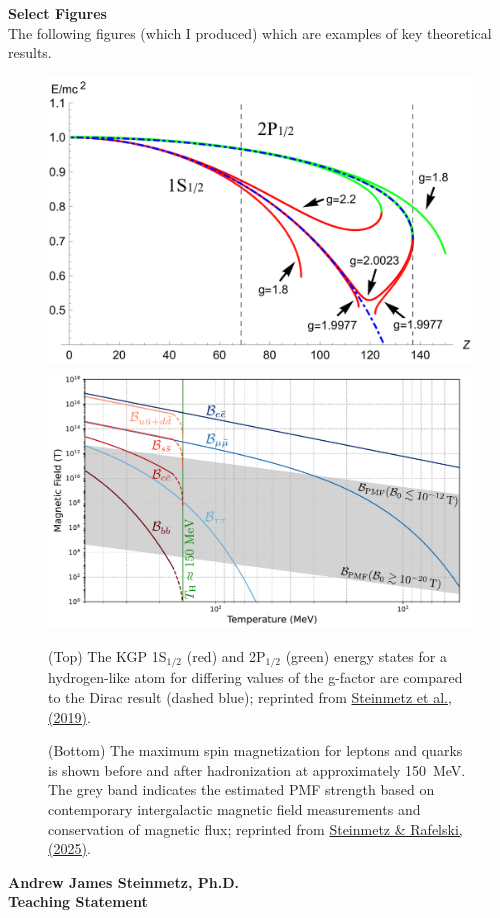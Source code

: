 \documentclass[11pt]{article}
\begin{document}
{\noindent\Large\textbf{Select Figures}}\\
The following figures (which I produced) which are examples of key theoretical results.
\begin{figure}[h!]
    \centering
        \includegraphics[width=0.74\linewidth]{Figure_1.pdf}\\
        \includegraphics[width=0.80\linewidth]{Figure_2.pdf}
    \caption{(Top) The KGP 1S\(_{1/2}\) (red) and 2P\(_{1/2}\) (green) energy states for a hydrogen-like atom for differing values of the g-factor are compared to the Dirac result (dashed blue); reprinted from \href{https://doi.org/10.1140/epja/i2019-12715-5}{Steinmetz et al., (2019)}.}
    \label{fig:figure1}
    \caption{(Bottom) The maximum spin magnetization for leptons and quarks is shown before and after hadronization at approximately 150~MeV. The grey band indicates the estimated PMF strength based on contemporary intergalactic magnetic field measurements and conservation of magnetic flux; reprinted from \href{https://doi.org/10.48550/arXiv.2502.05052}{Steinmetz \& Rafelski, (2025)}.}
    \label{fig:figure2}
\end{figure}

\newpage

\begin{center}
    {\Large\textbf{Andrew James Steinmetz, Ph.D.}}\\[0.5em]
    {\large\textbf{Teaching Statement}}
\end{center}
\end{document}

